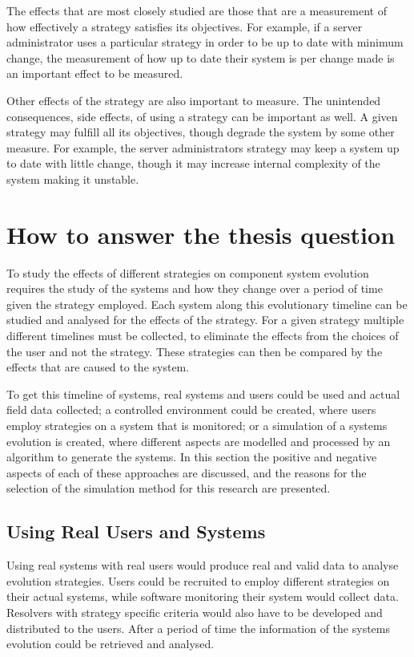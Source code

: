 The effects that are most closely studied are those that are a measurement of how effectively a strategy satisfies its objectives.
For example, if a server administrator uses a particular strategy in order to be up to date with minimum change,
the measurement of how up to date their system is per change made is an important effect to be measured.

Other effects of the strategy are also important to measure.
The unintended consequences, side effects, of using a strategy can be important as well.
A given strategy may fulfill all its objectives, though degrade the system by some other measure.
For example, the server administrators strategy may keep a system up to date with little change, 
though it may increase internal complexity of the system making it unstable. 

\section{How to answer the thesis question}
To study the effects of different strategies on component system evolution requires the study of the systems and how they change over a period of time given the strategy employed. 
Each system along this evolutionary timeline can be studied and analysed for the effects of the strategy.
For a given strategy multiple different timelines must be collected, to eliminate the effects from the choices of the user and not the strategy.
These strategies can then be compared by the effects that are caused to the system.

To get this timeline of systems, real systems and users could be used and actual field data collected;
a controlled environment could be created, where users employ strategies on a system that is monitored;
or a simulation of a systems evolution is created, where different aspects are modelled and processed by an algorithm to generate the systems.
In this section the positive and negative aspects of each of these approaches are discussed,
and the reasons for the selection of the simulation method for this research are presented.

\subsection{Using Real Users and Systems}
Using real systems with real users would produce real and valid data to analyse evolution strategies.
Users could be recruited to employ different strategies on their actual systems, while software monitoring their system would collect data.
Resolvers with strategy specific criteria would also have to be developed and distributed to the users.
After a period of time the information of the systems evolution could be retrieved and analysed.

